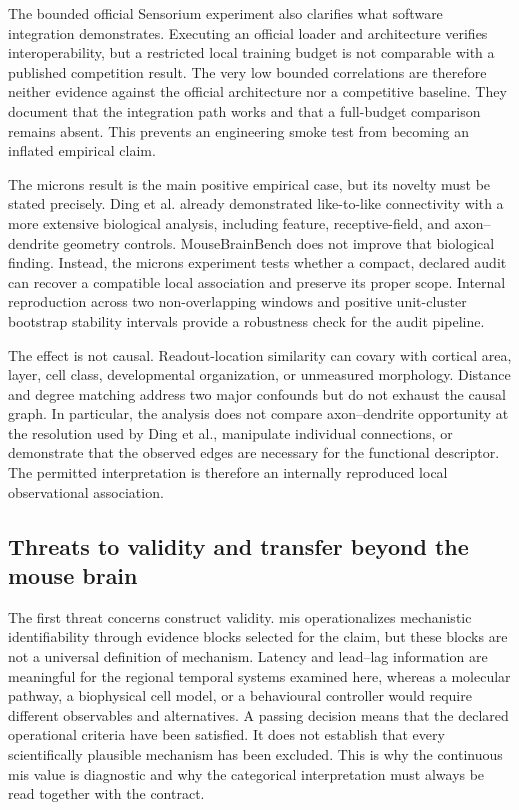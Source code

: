 \documentclass[a4paper,fleqn]{cas-sc}
\begin{document}
The bounded official Sensorium experiment also clarifies what software
integration demonstrates. Executing an official loader and architecture verifies
interoperability, but a restricted local training budget is not comparable with
a published competition result. The very low bounded correlations are therefore
neither evidence against the official architecture nor a competitive baseline.
They document that the integration path works and that a full-budget comparison
remains absent. This prevents an engineering smoke test from becoming an
inflated empirical claim.

The \acs{microns} result is the main positive empirical case, but its novelty must be
stated precisely. Ding et al. already demonstrated like-to-like connectivity
with a more extensive biological analysis, including feature, receptive-field,
and axon--dendrite geometry controls. MouseBrainBench does not improve that
biological finding. Instead, the \acs{microns} experiment tests whether a compact,
declared audit can recover a compatible local association and preserve its
proper scope. Internal reproduction across two non-overlapping windows and positive
unit-cluster bootstrap stability intervals provide a robustness check for the audit
pipeline.

The effect is not causal. Readout-location similarity can covary with cortical
area, layer, cell class, developmental organization, or unmeasured morphology.
Distance and degree matching address two major confounds but do not exhaust the
causal graph. In particular, the analysis does not compare axon--dendrite
opportunity at the resolution used by Ding et al., manipulate individual
connections, or demonstrate that the observed edges are necessary for the
functional descriptor. The permitted interpretation is therefore an internally reproduced
local observational association.

\subsection{Threats to validity and transfer beyond the mouse brain}
\label{subsec:validity-transfer}

The first threat concerns construct validity. \acs{mis} operationalizes mechanistic
identifiability through evidence blocks selected for the claim, but these blocks
are not a universal definition of mechanism. Latency and lead--lag information
are meaningful for the regional temporal systems examined here, whereas a
molecular pathway, a biophysical cell model, or a behavioural controller would
require different observables and alternatives. A passing decision means that
the declared operational criteria have been satisfied. It does not establish
that every scientifically plausible mechanism has been excluded. This is why
the continuous \acs{mis} value is diagnostic and why the categorical interpretation
must always be read together with the contract.
\end{document}
